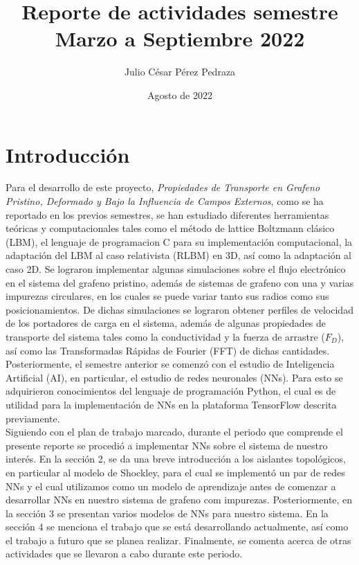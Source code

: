 \documentclass{article}
\title{Reporte de actividades semestre Marzo a Septiembre 2022}
\author{Julio César Pérez Pedraza}
\date{Agosto de 2022}
\begin{document}
\maketitle

\section{Introducción}

Para el desarrollo de este proyecto,  \textit{Propiedades de Transporte en Grafeno Pristino, Deformado y Bajo la Influencia de Campos Externos}, como se ha reportado en los previos semestres, se han estudiado diferentes herramientas teóricas y computacionales tales como el método de lattice Boltzmann clásico (LBM), el lenguaje de programacion C para su implementación computacional, la adaptación del LBM al caso relativista (RLBM) en 3D, así como la adaptación al caso 2D. Se lograron implementar algunas simulaciones sobre el flujo electrónico en el sistema del grafeno pristino, además de sistemas de grafeno con una y varias impurezas circulares, en los cuales se puede variar tanto sus radios como sus posicionamientos. De dichas simulaciones se lograron obtener perfiles de velocidad de los portadores de carga en el sistema, además de algunas propiedades de transporte del sistema tales como la conductividad y la fuerza de arrastre ($F_D$), así como las Transformadas Rápidas de Fourier (FFT) de dichas cantidades. Posteriormente, el semestre anterior se comenzó con el estudio de Inteligencia Artificial (AI), en particular, el estudio de redes neuronales (NNs). Para esto se adquirieron conocimientos del lenguaje de programación Python, el cual es de utilidad para la implementación de NNs en la plataforma TensorFlow descrita previamente.\\

Siguiendo con el plan de trabajo marcado, durante el periodo que comprende el presente reporte se procedió a implementar NNs sobre el sistema de nuestro interés. En la sección 2, se da una breve introducción a los aislantes topológicos, en particular al modelo de Shockley, para el cual se implementó un par de redes NNs y el cual utilizamos como un modelo de aprendizaje antes de comenzar a desarrollar NNs en nuestro sistema de grafeno com impurezas. Posteriormente, en la sección 3 se presentan varios modelos de NNs para nuestro sistema. En la sección 4 se menciona el trabajo que se está desarrollando actualmente, así como el trabajo a futuro que se planea realizar. Finalmente, se comenta acerca de otras actividades que se llevaron a cabo durante este periodo.
\end{document}
